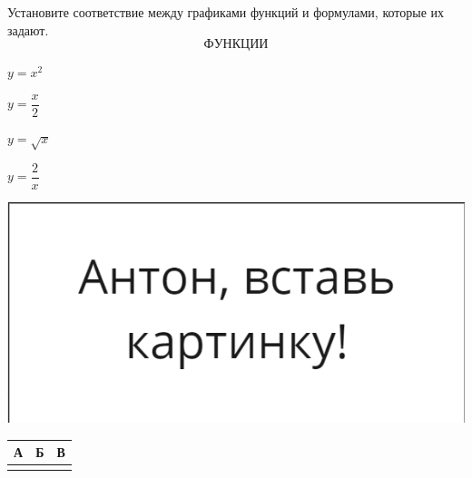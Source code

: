 \begin{class}[number=3]
\begin{listofex}
			\item 
			\begin{minipage}[t]{0.57\textwidth}
				Установите соответствие между графиками функций и формулами, которые их задают. 
				\[ФУНКЦИИ\]
				\begin{enumcols}[itemcolumns=1]
					\item \( y=x^2 \)
					\item \( y=\dfrac{x}{2} \)
					\item \( y=\sqrt{x} \)
					\item \( y=\dfrac{2}{x} \)
				\end{enumcols}
			\end{minipage}
			\begin{minipage}[c]{0.3\textwidth}
				\includegraphics[align=t, width=\textwidth]{pics/G91M4L4-1}
			\end{minipage}
			\begin{center}
				\footnotesize
				\begin{tabular}{|c|c|c|}
					\hline
					А&Б&В\\
					\hline
					 & & \\
					 \hline
				\end{tabular}
			\end{center}
		

\end{listofex}
\end{class}
